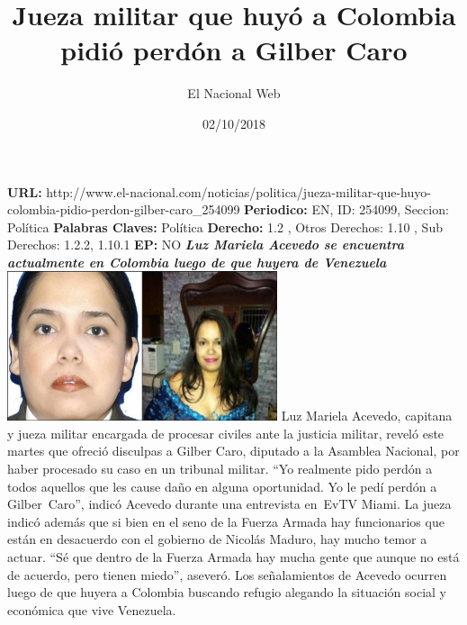 \documentclass{article}%
\title{\textbf{Jueza militar que huyó a Colombia pidió perdón a Gilber Caro}}%
\author{El Nacional Web}%
\date{02/10/2018}%
\begin{document}
%
\normalsize%
\maketitle%
\textbf{URL: }%
http://www.el{-}nacional.com/noticias/politica/jueza{-}militar{-}que{-}huyo{-}colombia{-}pidio{-}perdon{-}gilber{-}caro\_254099\newline%
%
\textbf{Periodico: }%
EN, %
ID: %
254099, %
Seccion: %
Política\newline%
%
\textbf{Palabras Claves: }%
Política\newline%
%
\textbf{Derecho: }%
1.2%
, Otros Derechos: %
1.10%
, Sub Derechos: %
1.2.2, 1.10.1%
\newline%
%
\textbf{EP: }%
NO\newline%
\newline%
%
\textbf{\textit{Luz Mariela Acevedo se encuentra actualmente en Colombia luego de que huyera de Venezuela}}%
\newline%
\newline%
%
\includegraphics[width=300px]{59.jpg}%
\newline%
%
Luz Mariela Acevedo, capitana y jueza militar encargada de procesar civiles ante la justicia militar, reveló este martes que ofreció disculpas a Gilber Caro, diputado a la Asamblea Nacional, por haber procesado su caso en un tribunal militar.%
\newline%
%
“Yo realmente pido perdón a todos aquellos que les cause daño en alguna oportunidad. Yo le pedí perdón a Gilber~Caro”, indicó Acevedo durante una entrevista en~EvTV Miami.%
\newline%
%
La jueza indicó además que si bien en el seno de la Fuerza Armada hay funcionarios que están en desacuerdo con el gobierno de Nicolás Maduro, hay mucho temor a actuar.%
\newline%
%
“Sé que dentro de la Fuerza Armada hay mucha gente que aunque no está de acuerdo, pero tienen miedo”, aseveró.%
\newline%
%
Los señalamientos de Acevedo ocurren luego de que huyera a Colombia buscando refugio alegando la situación social y económica que vive Venezuela.%
\newline%
%
\end{document}
